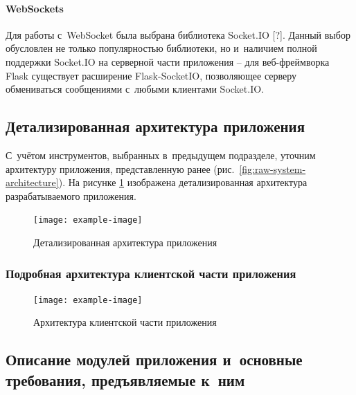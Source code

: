 \paragraph{WebSockets}

Для работы с~WebSocket была выбрана библиотека Socket.IO [?]. Данный выбор обусловлен не только популярностью библиотеки, но и~наличием полной поддержки Socket.IO на серверной части приложения -- для веб-фреймворка Flask существует расширение Flask-SocketIO, позволяющее серверу обмениваться сообщениями с~любыми клиентами Socket.IO.

\subsection{Детализированная архитектура приложения}
\label{subsec:app-architecture}

С~учётом инструментов, выбранных в~предыдущем подразделе, уточним архитектуру приложения, представленную ранее (рис.~\ref{fig:raw-system-architecture}). На рисунке \ref{fig:complete-system-architecture} изображена детализированная архитектура разрабатываемого приложения.

\begin{figure}[h!]
  \centering
  \setlength{\fboxsep}{5pt}
  \texttt{[image: example-image]}
  \vspace*{12pt}
  \caption{Детализированная архитектура приложения}\label{fig:complete-system-architecture}
\end{figure}

\subsubsection{Подробная архитектура клиентской части приложения}
\label{subsec:frontend-architecture}

\begin{figure}[h!]
  \centering
  \setlength{\fboxsep}{5pt}
  \texttt{[image: example-image]}
  \vspace*{12pt}
  \caption{Архитектура клиентской части приложения}\label{fig:fe-architecture}
\end{figure}


\subsection{Описание модулей приложения и~основные требования, предъявляемые к~ним}
\label{subsec:app-modules-requirements}


